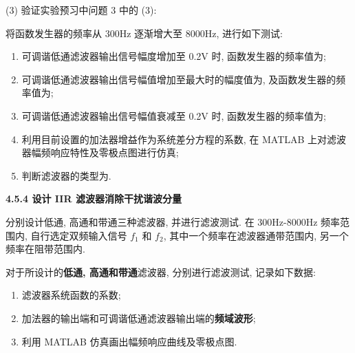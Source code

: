 \documentclass{dspreport}
\begin{document}
\begin{figure}[H]

\end{figure}

\begin{block}

\end{block}

(3) 验证实验预习中问题 3 中的 (3):

将函数发生器的频率从 300Hz 逐渐增大至 8000Hz, 进行如下测试:
\begin{enumerate}[label=\textcircled{\arabic*}]
    \item 可调谐低通滤波器输出信号幅度增加至 0.2V 时, 函数发生器的频率值为\underline{\blank{  }};
    \item 可调谐低通滤波器输出信号幅值增加至最大时的幅度值为\underline{\blank{  }}, 及函数发生器的频率值为\underline{\blank{  }};
    \item 可调谐低通滤波器输出信号幅值衰减至 0.2V 时, 函数发生器的频率值为\underline{\blank{  }};
    \item 利用目前设置的加法器增益作为系统差分方程的系数, 在 MATLAB 上对滤波器幅频响应特性及零极点图进行仿真;
    \item 判断滤波器的类型为\underline{\blank{  }}.
\end{enumerate}
\begin{block}

\end{block}

\begin{figure}[H]

\end{figure}

\begin{block}

\end{block}

\textbf{4.5.4 设计 IIR 滤波器消除干扰谐波分量}

分别设计低通, 高通和带通三种滤波器, 并进行滤波测试. 在 300Hz-8000Hz 频率范围内, 自行选定双频输入信号 $f_1$ 和 $f_2$, 其中一个频率在滤波器通带范围内, 另一个频率在阻带范围内.

对于所设计的\textbf{低通, 高通和带通}滤波器, 分别进行滤波测试, 记录如下数据:
\begin{enumerate}[label=\textcircled{\arabic*}]
    \item 滤波器系统函数的系数;
    \item 加法器的输出端和可调谐低通滤波器输出端的\textbf{频域波形};
    \item 利用 MATLAB 仿真画出幅频响应曲线及零极点图.
\end{enumerate}
\end{document}
